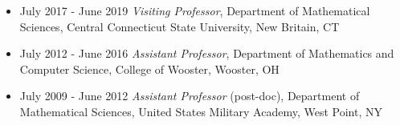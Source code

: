 \documentclass[letterpaper]{article}
\begin{document}
{{{{{\begin{itemize}
 \item July 2017 - June 2019 \emph{Visiting Professor}, Department of Mathematical Sciences, Central Connecticut State University, New Britain, CT
 \item July 2012 - June 2016 \emph{Assistant Professor}, Department of Mathematics and Computer Science, College of Wooster, Wooster, OH
 \item July 2009 - June 2012 \emph{Assistant Professor} (post-doc), Department of Mathematical Sciences, United States Military Academy, West Point, NY
 \end{itemize}
 
  \begin{comment}
\begin{tabular}{ll}
 2020 - present & \emph{Senior Data Scientist}, Ancera LLC\\ 
  & - Work with scientists in developing assays that meet AOAC guidelines \\
  & - Build interactive data applications with RShiny that allows customers to gain\\
  & \hspace{0.06in} insights from data in real time\\
  & - Perform data analyses that offers insights to help poultry growers raise healthier \\
  &  \hspace{0.06in}  flocks with better yields \\
 2016 - present & \emph{Owner/Principal Data Science Consultant}, Analytix LLC, a data science and \\
 & mathematical modeling consulting business\\
 & Examples of projects completed for clients: \\
 & - Developed interactive data visualization and user-customizable report applications \\
 & \hspace{0.06in} in R Shiny\\
 & - Built machine learning algorithms and mathematical models of product  \\
 & \hspace{0.06in} performance to help the client improve manufacturing processes and reduce \\
 & \hspace{0.06in} testing time and cost \\
  &  - Perform statistical analyses for assay development and method validation \\

\end{comment}}}}}}
\end{document}
